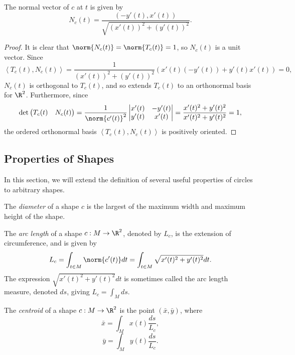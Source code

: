 \documentclass[12pt]{article}
\begin{document}
\begin{prop}
    The normal vector of $c$ at $t$ is given by \[N_c(t) = \frac{(-y'(t), x'(t))}{\sqrt{(x'(t))^2 + (y'(t))^2}}.\]
\end{prop}

\begin{proof}
    It is clear that $\norm{N_c(t)} = \norm{T_c(t)} = 1$, so $N_c(t)$ is a unit vector. Since \[\left\langle T_c(t), N_c(t) \right\rangle = \frac{1}{(x'(t))^2 + (y'(t))^2}\left(x'(t)(-y'(t)) + y'(t)x'(t)\right) = 0,\] $N_c(t)$ is orthogonal to $T_c(t)$, and so extends $T_c(t)$ to an orthonormal basis for $\R^2$. Furthermore, since \[\det\begin{pmatrix}
        T_c(t) & N_c(t)
    \end{pmatrix} = \frac{1}{\norm{c'(t)}^2}\begin{vmatrix}
        x'(t) & -y'(t) \\ y'(t) & x'(t)
    \end{vmatrix} = \frac{x'(t)^2 + y'(t)^2}{x'(t)^2 + y'(t)^2} = 1,\] the ordered orthonormal basis $\left\langle T_c(t), N_c(t) \right\rangle$ is positively oriented.
\end{proof}

\subsection{Properties of Shapes}

In this section, we will extend the definition of several useful properties of circles to arbitrary shapes.

\begin{defn}
    The \emph{diameter} of a shape $c$ is the largest of the maximum width and maximum height of the shape.
\end{defn}

\begin{defn}
    The \emph{arc length} of a shape $c: M \to \R^2$, denoted by $L_c$, is the extension of circumference, and is given by \[L_c = \int_{t\in M}\norm{c'(t)}dt = \int_{t\in M}{\sqrt{x'(t)^2 + y'(t)^2}}dt.\] The expression ${\sqrt{x'(t)^2 + y'(t)^2}}dt$ is sometimes called the arc length measure, denoted $ds$, giving $L_c = \int_M ds$.
\end{defn}

\begin{defn}
    The \emph{centroid} of a shape $c: M \to \R^2$ is the point $(\bar{x}, \bar{y})$, where \[\bar{x} = \int_M x(t)\frac{ds}{L_c},\] \[\bar{y} = \int_M y(t)\frac{ds}{L_c}.\]
\end{defn}
\end{document}
